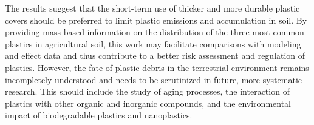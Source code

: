 The results suggest that the short-term use of thicker and more durable plastic covers should be preferred to limit plastic emissions and accumulation in soil.
By providing mass-based information on the distribution of the three most common plastics in agricultural soil, this work may facilitate comparisons with modeling and effect data and thus contribute to a better risk assessment and regulation of plastics. However, the fate of plastic debris in the terrestrial environment remains incompletely understood and needs to be scrutinized in future, more systematic research. This should include the study of aging processes, the interaction of plastics with other organic and inorganic compounds, and the environmental impact of biodegradable plastics and nanoplastics.